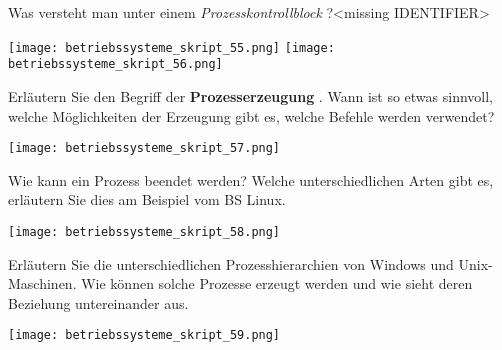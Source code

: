\documentclass{article}
\begin{document}
\begin{tcolorbox}[colback=white!10!white,colframe=lightgray!75!black,
  savelowerto=\jobname_ex.tex]

\begin{center}
Was versteht man unter einem 
\textit{Prozesskontrollblock
}?<missing IDENTIFIER>

\end{center}

\tcblower

\justifying
\texttt{[image: betriebssysteme\_skript\_55.png]}
\texttt{[image: betriebssysteme\_skript\_56.png]}

\end{tcolorbox}
\begin{tcolorbox}[colback=white!10!white,colframe=lightgray!75!black,
  savelowerto=\jobname_ex.tex]

\begin{center}
Erläutern Sie den Begriff der 
\textbf{Prozesserzeugung
}. 
Wann ist so etwas sinnvoll, welche Möglichkeiten der Erzeugung gibt es, welche Befehle werden verwendet?

\end{center}

\tcblower

\justifying
\texttt{[image: betriebssysteme\_skript\_57.png]}

\end{tcolorbox}
\begin{tcolorbox}[colback=white!10!white,colframe=lightgray!75!black,
  savelowerto=\jobname_ex.tex]

\begin{center}
Wie kann ein Prozess beendet werden?
Welche unterschiedlichen Arten gibt es, erläutern Sie dies am Beispiel vom BS Linux.

\end{center}

\tcblower

\justifying
\texttt{[image: betriebssysteme\_skript\_58.png]}

\end{tcolorbox}
\begin{tcolorbox}[colback=white!10!white,colframe=lightgray!75!black,
  savelowerto=\jobname_ex.tex]

\begin{center}
Erläutern Sie die unterschiedlichen Prozesshierarchien von Windows und Unix-Maschinen.
Wie können solche Prozesse erzeugt werden und wie sieht deren Beziehung untereinander aus.

\end{center}

\tcblower

\justifying
\texttt{[image: betriebssysteme\_skript\_59.png]}

\end{tcolorbox}
\end{document}
